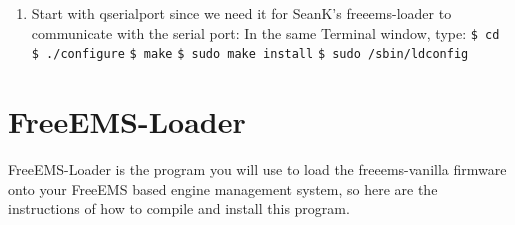 \documentclass[12pt,notitlepage,onecolumn,oneside,openany]{memoir}
\begin{document}
\begin{enumerate}
\item \textsf{Start with qserialport since we need it for SeanK's freeems-loader to communicate with the serial port:} \newline
      \textsf{In the same Terminal window, type:} \newline
      \texttt{\$ cd }  \newline
      \texttt{\$ ./configure} \newline
      \texttt{\$ make} \newline
      \texttt{\$ sudo make install} \newline
      \texttt{\$ sudo /sbin/ldconfig} \newline
\end{enumerate}

\chapter{\textsf{FreeEMS-Loader}}

\textsf{FreeEMS-Loader is the program you will use to load the freeems-vanilla firmware onto your FreeEMS based engine management system, so here are the instructions of how to compile and install this program.} \newline
\end{document}
